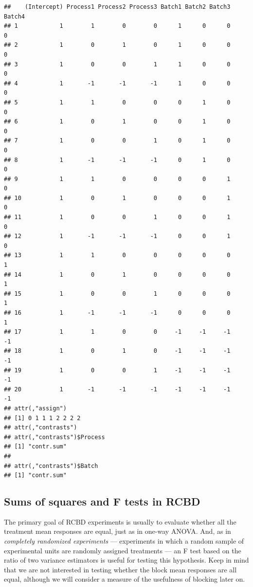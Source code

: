 \documentclass[
]{book}
\begin{document}
\begin{verbatim}
##    (Intercept) Process1 Process2 Process3 Batch1 Batch2 Batch3 Batch4
## 1            1        1        0        0      1      0      0      0
## 2            1        0        1        0      1      0      0      0
## 3            1        0        0        1      1      0      0      0
## 4            1       -1       -1       -1      1      0      0      0
## 5            1        1        0        0      0      1      0      0
## 6            1        0        1        0      0      1      0      0
## 7            1        0        0        1      0      1      0      0
## 8            1       -1       -1       -1      0      1      0      0
## 9            1        1        0        0      0      0      1      0
## 10           1        0        1        0      0      0      1      0
## 11           1        0        0        1      0      0      1      0
## 12           1       -1       -1       -1      0      0      1      0
## 13           1        1        0        0      0      0      0      1
## 14           1        0        1        0      0      0      0      1
## 15           1        0        0        1      0      0      0      1
## 16           1       -1       -1       -1      0      0      0      1
## 17           1        1        0        0     -1     -1     -1     -1
## 18           1        0        1        0     -1     -1     -1     -1
## 19           1        0        0        1     -1     -1     -1     -1
## 20           1       -1       -1       -1     -1     -1     -1     -1
## attr(,"assign")
## [1] 0 1 1 1 2 2 2 2
## attr(,"contrasts")
## attr(,"contrasts")$Process
## [1] "contr.sum"
## 
## attr(,"contrasts")$Batch
## [1] "contr.sum"
\end{verbatim}

\hypertarget{sums-of-squares-and-f-tests-in-rcbd}{%
\subsection{Sums of squares and F tests in RCBD}\label{sums-of-squares-and-f-tests-in-rcbd}}

The primary goal of RCBD experiments is usually to evaluate whether all the treatment mean responses are equal, just as in one-way ANOVA. And, as in \emph{completely randomized experiments} --- experiments in which a random sample of experimental units are randomly assigned treatments --- an F test based on the ratio of two variance estimators is useful for testing this hypothesis. Keep in mind that we are not interested in testing whether the block mean responses are all equal, although we will consider a measure of the usefulness of blocking later on.
\end{document}
